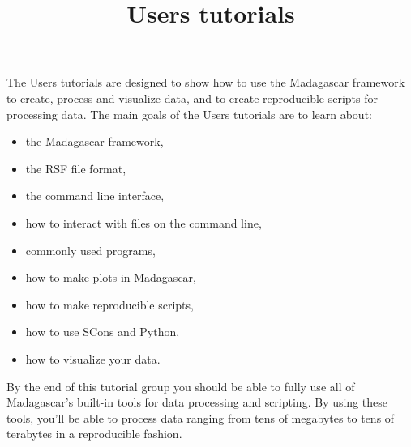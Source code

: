 \title{Users tutorials}
The Users tutorials are designed to show how to use the Madagascar framework to create, process and visualize data, and to create reproducible scripts for processing data.  The main goals of the Users tutorials are to learn about:
\begin{itemize}
    \item the Madagascar framework,
    \item the RSF file format,
    \item the command line interface,
    \item how to interact with files on the command line,
    \item commonly used programs,
    \item how to make plots in Madagascar,
    \item how to make reproducible scripts,
    \item how to use SCons and Python,
    \item how to visualize your data.
\end{itemize}
By the end of this tutorial group you should be able to fully use all of Madagascar's built-in tools for data processing and scripting.  By using these tools, you'll be able to process data ranging from tens of megabytes to tens of terabytes in a reproducible fashion.  







